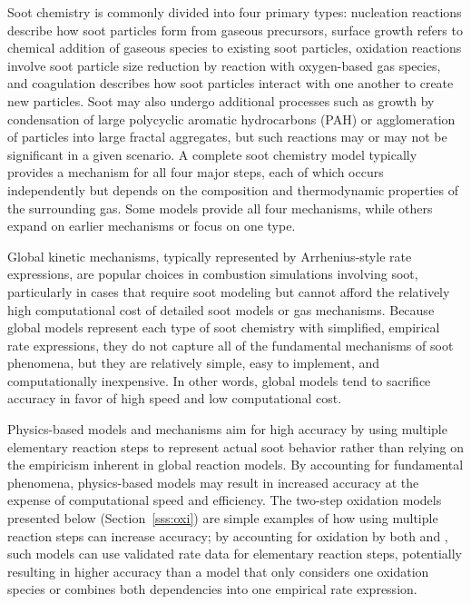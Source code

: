 \documentclass[preprint,letterpaper]{elsarticle}
\begin{document}
Soot chemistry is commonly divided into four primary types: nucleation reactions describe how soot particles form from gaseous precursors, surface growth refers to chemical addition of gaseous species to existing soot particles, oxidation reactions involve soot particle size reduction by reaction with oxygen-based gas species, and coagulation describes how soot particles interact with one another to create new particles. Soot may also undergo additional processes such as growth by condensation of large polycyclic aromatic hydrocarbons (PAH) or agglomeration of particles into large fractal aggregates, but such reactions may or may not be significant in a given scenario. A complete soot chemistry model typically provides a mechanism for all four major steps, each of which occurs independently but depends on the composition and thermodynamic properties of the surrounding gas. Some models provide all four mechanisms, while others expand on earlier mechanisms or focus on one type.

Global kinetic mechanisms, typically represented by Arrhenius-style rate expressions, are popular choices in combustion simulations involving soot, particularly in cases that require soot modeling but cannot afford the relatively high computational cost of detailed soot models or gas mechanisms. Because global models represent each type of soot chemistry with simplified, empirical rate expressions, they do not capture all of the fundamental mechanisms of soot phenomena, but they are relatively simple, easy to implement, and computationally inexpensive. In other words, global models tend to sacrifice accuracy in favor of high speed and low computational cost.

Physics-based models and mechanisms aim for high accuracy by using multiple elementary reaction steps to represent actual soot behavior rather than relying on the empiricism inherent in global reaction models. By accounting for fundamental phenomena, physics-based models may result in increased accuracy at the expense of computational speed and efficiency. The two-step oxidation models presented below (Section~\ref{sss:oxi}) are simple examples of how using multiple reaction steps can increase accuracy; by accounting for oxidation by both  and , such models can use validated rate data for elementary reaction steps, potentially resulting in higher accuracy than a model that only considers one oxidation species or combines both dependencies into one empirical rate expression.
\end{document}
